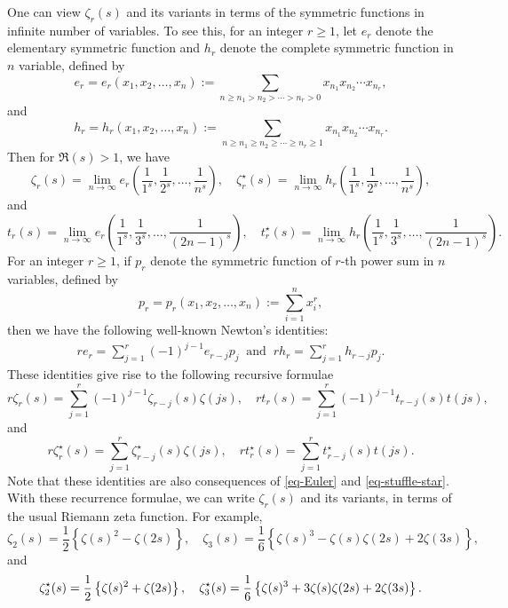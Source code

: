 \documentclass[12pt]{amsart}
\begin{document}
One can view $\zeta_r(s)$ and its variants in terms of the symmetric functions in infinite number of variables. To see this, for an integer $r\geq 1$, let $e_r$ denote the elementary symmetric function and $h_r$ denote the complete symmetric function in $n$ variable, defined by
$$
e_r=e_r(x_1,x_2,\ldots,x_n):=\sum_{n\geq n_1>n_2>\cdots>n_r>0}x_{n_1}x_{n_2}\cdots x_{n_r},
$$
and 
$$
h_r=h_r(x_1,x_2,\ldots,x_n):=\sum_{n\geq n_1\geq n_2\geq \cdots \geq n_r\geq 1 }x_{n_1}x_{n_2}\cdots x_{n_r}.
$$
Then for $\Re(s)>1$, we have
$$
\zeta_r(s)=\lim_{n\rightarrow\infty}e_r\left(\frac{1}{1^s},\frac{1}{2^s},\ldots,\frac{1}{n^s}\right), \quad 
\zeta^{\star}_r(s)=\lim_{n\rightarrow\infty}h_r\left(\frac{1}{1^s},\frac{1}{2^s},\ldots,\frac{1}{n^s}\right),
$$
and 
$$
t_r(s)=\lim_{n\rightarrow\infty}e_r\left(\frac{1}{1^s},\frac{1}{3^s},\ldots,\frac{1}{(2n-1)^s}\right), \quad 
t^{\star}_r(s)=\lim_{n\rightarrow\infty}h_r\left(\frac{1}{1^s},\frac{1}{3^s},\ldots,\frac{1}{(2n-1)^s}\right).
$$
For an integer $r \ge 1$, if $p_r$ denote the symmetric function of $r$-th power sum in $n$ variables, defined by  
$$
p_r=p_r(x_1,x_2,\ldots,x_n):=\sum_{i=1}^{n}x_i^r,
$$
then we have the following well-known Newton's identities:
\begin{align*}
re_r=\sum_{j=1}^{r}(-1)^{j-1}e_{r-j}p_j
\ \text{ and } \
rh_r=\sum_{j=1}^{r}h_{r-j}p_j.
\end{align*}
These identities give rise to the following recursive formulae
\begin{equation}\label{fundamental-formula}
r\zeta_r(s)=\sum_{j=1}^{r}(-1)^{j-1}\zeta_{r-j}(s)\zeta(js), \quad rt_r(s)=\sum_{j=1}^{r}(-1)^{j-1}t_{r-j}(s)t(js),
\end{equation}
and
\begin{equation}\label{fundamental-formula-star}
r\zeta^{\star}_r(s)=\sum_{j=1}^{r}\zeta^{\star}_{r-j}(s)\zeta(js), \quad rt^{\star}_r(s)=\sum_{j=1}^{r}t^{\star}_{r-j}(s)t(js).
\end{equation}
Note that these identities are also consequences of \eqref{eq-Euler} and \eqref{eq-stuffle-star}. With these recurrence formulae, we can write $\zeta_r(s)$ and its variants, in terms of the usual Riemann zeta function. For example,
\begin{equation}\label{zeta_2-zeta_3}
\zeta_2(s)=\frac{1}{2}\left\{\zeta(s)^2-\zeta(2s)\right\}, \quad \zeta_3(s)=\frac{1}{6}\left\{\zeta(s)^3-\zeta(s)\zeta(2s)+2\zeta(3s)\right\},
\end{equation}
and 
\begin{equation}\label{zeta^{star}_2-zeta^{star}_3}
\zeta^{\star}_2(s)=\frac{1}{2}\left\{\zeta(s)^2+\zeta(2s)\right\}, \quad \zeta^{\star}_3(s)=\frac{1}{6}\left\{\zeta(s)^3+3\zeta(s)\zeta(2s)+2\zeta(3s)\right\}.
\end{equation}
\end{document}
